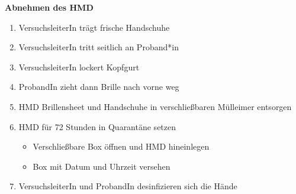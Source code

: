 \documentclass[24pt, a4paper, portrait]{article}
\begin{document}
\vspace{0.5cm}

\Large
\textbf{Abnehmen des HMD}

\large

\begin{enumerate}
    \item VersuchsleiterIn trägt frische Handschuhe
    \item VersuchsleiterIn tritt seitlich an Proband*in
    \item VersuchsleiterIn lockert Kopfgurt
    \item ProbandIn zieht dann Brille nach vorne weg
    \item HMD Brillensheet und Handschuhe in verschließbaren Mülleimer entsorgen
    \item HMD für 72 Stunden in Quarantäne setzen
    \begin{itemize}
        \item Verschließbare Box öffnen und HMD hineinlegen
        \item Box mit Datum und Uhrzeit versehen
    \end{itemize}
    \item VersuchsleiterIn und ProbandIn desinfizieren sich die Hände
\end{enumerate}
\end{document}
